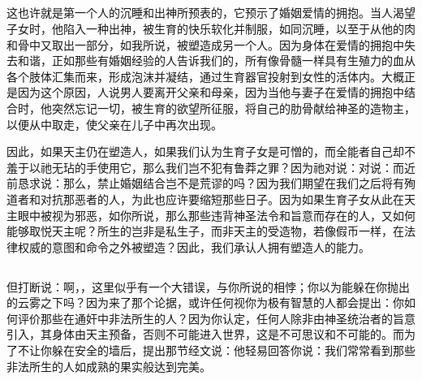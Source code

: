 
\subsection{}

这也许就是第一个人的沉睡和出神所预表的，它预示了婚姻爱情的拥抱。当人渴望子女时，他陷入一种出神，被生育的快乐软化并制服，如同沉睡，以至于从他的肉和骨中又取出一部分，如我所说，被塑造成另一个人。因为身体在爱情的拥抱中失去和谐，正如那些有婚姻经验的人告诉我们的，所有像骨髓一样具有生殖力的血从各个肢体汇集而来，形成泡沫并凝结，通过生育器官投射到女性的活体内。大概正是因为这个原因，人说男人要离开父亲和母亲，因为当他与妻子在爱情的拥抱中结合时，他突然忘记一切，被生育的欲望所征服，将自己的肋骨献给神圣的造物主，以便从中取走，使父亲在儿子中再次出现。\par

因此，如果天主仍在塑造人，如果我们认为生育子女是可憎的，而全能者自己却不羞于以祂无玷的手使用它，那么我们岂不犯有鲁莽之罪？因为祂对说：对说：而近前恳求说：那么，禁止婚姻结合岂不是荒谬的吗？因为我们期望在我们之后将有殉道者和对抗那恶者的人，为此也应许要缩短那些日子。因为如果生育子女从此在天主眼中被视为邪恶，如你所说，那么那些违背神圣法令和旨意而存在的人，又如何能够取悦天主呢？所生的岂非是私生子，而非天主的受造物，若像假币一样，在法律权威的意图和命令之外被塑造？因此，我们承认人拥有塑造人的能力。\par


\subsection{}

但打断说：啊，，这里似乎有一个大错误，与你所说的相悖；你以为能躲在你抛出的云雾之下吗？因为来了那个论据，或许任何视你为极有智慧的人都会提出：你如何评价那些在通奸中非法所生的人？因为你认定，任何人除非由神圣统治者的旨意引入，其身体由天主预备，否则不可能进入世界，这是不可思议和不可能的。而为了不让你躲在安全的墙后，提出那节经文说：他轻易回答你说：我们常常看到那些非法所生的人如成熟的果实般达到完美。\par

